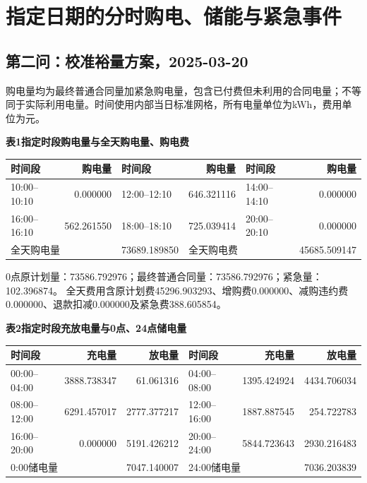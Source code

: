 \clearpage
\section{指定日期的分时购电、储能与紧急事件}
\label{sec:designated_details}
\subsection{第二问：校准裕量方案，2025-03-20}
\begingroup\small
\setlength{\tabcolsep}{4pt}\renewcommand{\arraystretch}{1.08}
\setlength{\LTpre}{4pt}\setlength{\LTpost}{4pt}
\noindent 购电量均为最终普通合同量加紧急购电量，包含已付费但未利用的合同电量；不等同于实际利用电量。时间使用内部当日标准网格，所有电量单位为kWh，费用单位为元。
\begin{center}\textbf{表1\quad 指定时段购电量与全天购电量、购电费}\par\smallskip
\begin{tabular}{lr lr lr}\toprule
时间段 & 购电量 & 时间段 & 购电量 & 时间段 & 购电量\\\midrule
10:00--10:10 & 0.000000 & 12:00--12:10 & 646.321116 & 14:00--14:10 & 0.000000\\
16:00--16:10 & 562.261550 & 18:00--18:10 & 725.039414 & 20:00--20:10 & 0.000000\\
\midrule
\multicolumn{2}{l}{全天购电量} & 73689.189850 & \multicolumn{2}{l}{全天购电费} & 45685.509147\\
\bottomrule\end{tabular}\end{center}
\noindent 0点原计划量：73586.792976；最终普通合同量：73586.792976；紧急量：102.396874。
全天费用含原计划费45296.903293、增购费0.000000、减购违约费0.000000、退款扣减0.000000及紧急费388.605854。
\begin{center}\textbf{表2\quad 指定时段充放电量与0点、24点储电量}\par\smallskip
\begin{tabular}{lrr lrr}\toprule
时间段 & 充电量 & 放电量 & 时间段 & 充电量 & 放电量\\\midrule
00:00--04:00 & 3888.738347 & 61.061316 & 04:00--08:00 & 1395.424924 & 4434.706034\\
08:00--12:00 & 6291.457017 & 2777.377217 & 12:00--16:00 & 1887.887545 & 254.722783\\
16:00--20:00 & 0.000000 & 5191.426212 & 20:00--24:00 & 5844.723643 & 2930.216483\\
\midrule
\multicolumn{2}{l}{0:00储电量} & 7047.140007 & \multicolumn{2}{l}{24:00储电量} & 7036.203839\\
\bottomrule\end{tabular}\end{center}
